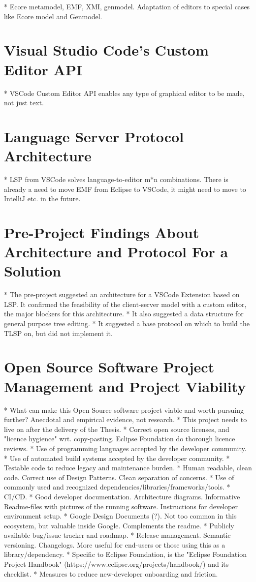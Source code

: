 * Ecore metamodel, EMF, XMI, genmodel. Adaptation of editors to special cases like Ecore model and Genmodel.

\section{Visual Studio Code's Custom Editor API}

* VSCode Custom Editor API enables any type of graphical editor to be made, not just text.

\section{Language Server Protocol Architecture}

* LSP from VSCode solves language-to-editor m*n combinations. There is already a need to move EMF from Eclipse to VSCode, it might need to move to IntelliJ etc. in the future.

\section{Pre-Project Findings About Architecture and Protocol For a Solution}

* The pre-project suggested an architecture for a VSCode Extension based on LSP. It confirmed the feasibility of the client-server model with a custom editor, the major blockers for this architecture.
  * It also suggested a data structure for general purpose tree editing.
  * It suggested a base protocol on which to build the TLSP on, but did not implement it.

\section{Open Source Software Project Management and Project Viability}

* What can make this Open Source software project viable and worth pursuing further? Anecdotal and empirical evidence, not research.
  * This project needs to live on after the delivery of the Thesis.
  * Correct open source licenses, and "licence hygience" wrt. copy-pasting. Eclipse Foundation do thorough licence reviews.
  * Use of programming languages accepted by the developer community.
  * Use of automated build systems accepted by the developer community.
  * Testable code to reduce legacy and maintenance burden.
  * Human readable, clean code. Correct use of Design Patterns. Clean separation of concerns.
  * Use of commonly used and recognized dependencies/libraries/frameworks/tools.
  * CI/CD.
  * Good developer documentation. Architecture diagrams. Informative Readme-files with pictures of the running software. Instructions for developer environment setup.
  * Google Design Documents (?). Not too common in this ecosystem, but valuable inside Google. Complements the readme.
  * Publicly available bug/issue tracker and roadmap.
  * Release management. Semantic versioning. Changelogs. More useful for end-users or those using this as a library/dependency.
  * Specific to Eclipse Foundation, is the "Eclipse Foundation Project Handbook" (https://www.eclipse.org/projects/handbook/) and its checklist.
  * Measures to reduce new-developer onboarding and friction.
